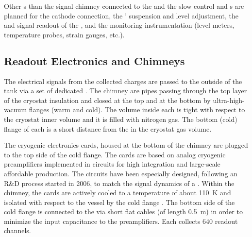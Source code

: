 Other \fdth{}s than the signal chimney connected to the  and the  slow control and \fdth{}s are planned for the cathode  connection, the ' suspension and level adjustment, the  and signal readout of the , and the monitoring instrumentation (level meters, temperature probes, strain gauges, etc.).

\subsection{Readout Electronics and Chimneys}
\label{v4:fddp-ov:electronics}

The electrical signals from the collected charges are passed to the outside of the tank via a set of dedicated . The chimney are pipes passing through the top layer of the cryostat insulation and closed at the top and at the bottom by ultra-high-vacuum flanges (warm and cold). The volume inside each  is tight with respect to the cryostat inner volume and it is filled with nitrogen gas. The bottom (cold) flange of each  is a short distance %
from the  in the cryostat gas volume.

The cryogenic  electronics cards, housed at the bottom of the chimney are plugged to the top side of  the cold flange. The  cards are based on analog cryogenic preamplifiers implemented in   circuits for high integration and large-scale affordable production. 
The  circuits have been especially designed, following an R\&D process started in 2006, to match the signal dynamics of a . Within the chimney, the cards are actively cooled to a temperature of about \SI{110}{K} and isolated with respect to the \lar vessel by the cold flange \fdth{}.  The bottom side of the cold flange is connected to the  via short flat cables (of length \SI{0.5}{m}) in order to minimize the input capacitance to the preamplifiers. Each  collects \num{640} readout channels. 


